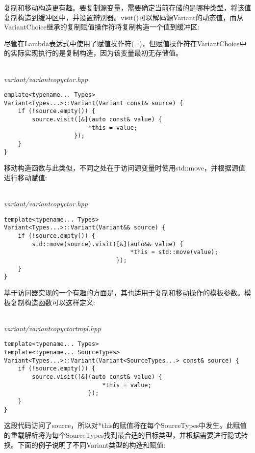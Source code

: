 复制和移动构造更有趣。要复制源变量，需要确定当前存储的是哪种类型，将该值复制构造到缓冲区中，并设置辨别器。visit()可以解码源Variant的动态值，而从VariantChoice继承的复制赋值操作符将复制构造一个值到缓冲区:

\begin{tcolorbox}[colback=webgreen!5!white,colframe=webgreen!75!black]
\hspace*{0.75cm}尽管在Lambda表达式中使用了赋值操作符(=)，但赋值操作符在VariantChoice中的实际实现执行的是复制构造，因为该变量最初无存储值。
\end{tcolorbox}

\hspace*{\fill} \\ %
\noindent
\textit{variant/variantcopyctor.hpp}
\begin{lstlisting}[style=styleCXX]
emplate<typename... Types>
Variant<Types...>::Variant(Variant const& source) {
	if (!source.empty()) {
		source.visit([&](auto const& value) {
						*this = value;
					});
	}
}
\end{lstlisting}

移动构造函数与此类似，不同之处在于访问源变量时使用std::move，并根据源值进行移动赋值:

\hspace*{\fill} \\ %
\noindent
\textit{variant/variantcopyctor.hpp}
\begin{lstlisting}[style=styleCXX]
template<typename... Types>
Variant<Types...>::Variant(Variant&& source) {
	if (!source.empty()) {
		std::move(source).visit([&](auto&& value) {
									*this = std::move(value);
								});
	}
}
\end{lstlisting}

基于访问器实现的一个有趣的方面是，其也适用于复制和移动操作的模板参数。模板复制构造函数可以这样定义:

\hspace*{\fill} \\ %
\noindent
\textit{variant/variantcopyctortmpl.hpp}
\begin{lstlisting}[style=styleCXX]
template<typename... Types>
template<typename... SourceTypes>
Variant<Types...>::Variant(Variant<SourceTypes...> const& source) {
	if (!source.empty()) {
		source.visit([&](auto const& value) {
							*this = value;
						});
	}
}
\end{lstlisting}

这段代码访问了source，所以对*this的赋值将在每个SourceTypes中发生。此赋值的重载解析将为每个SourceTypes找到最合适的目标类型，并根据需要进行隐式转换。下面的例子说明了不同Variant类型的构造和赋值:


